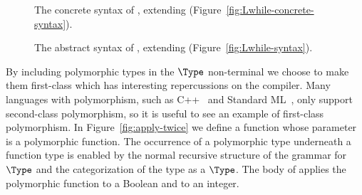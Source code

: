\documentclass[7x10,nocrop]{TimesAPriori_MIT}%
\newcommand{\gray}[1]{{\color{gray} #1}}
\begin{document}
\begin{figure}[tp]
\centering
\fbox{
  \begin{minipage}{0.96\textwidth}
\small
\[
\begin{array}{lcl}
  \Type &::=& \ldots \MID \LP\key{All}~\LP\Var\ldots\RP~ \Type\RP \MID \Var \\
  \Def &::=& \gray{ \CDEF{\Var}{\LS\Var \key{:} \Type\RS \ldots}{\Type}{\Exp} } \\
   &\MID& \LP\key{:}~\Var~\Type\RP \\
   &&       \LP\key{define}~ \LP\Var ~ \Var\ldots\RP ~ \Exp\RP  \\
  \LangPoly{} &::=& \gray{ \Def \ldots ~ \Exp }
\end{array}
\]
\end{minipage}
}
\caption{The concrete syntax of \LangPoly{}, extending \LangLoop{}
    (Figure~\ref{fig:Lwhile-concrete-syntax}).}
\label{fig:Rpoly-concrete-syntax}
\end{figure}

\begin{figure}[tp]
\centering
\fbox{
  \begin{minipage}{0.96\textwidth}
\small
\[
\begin{array}{lcl}
  \Type &::=& \ldots \MID \LP\key{All}~\LP\Var\ldots\RP~ \Type\RP \MID \Var \\
  \Def &::=& \gray{ \DEF{\Var}{\LP\LS\Var \key{:} \Type\RS \ldots\RP}{\Type}{\code{'()}}{\Exp} } \\
   &\MID& \DECL{\Var}{\Type} \\
   &&  \DEF{\Var}{\LP\Var \ldots\RP}{\key{'Any}}{\code{'()}}{\Exp}  \\
  \LangPoly{} &::=& \gray{ \PROGRAMDEFSEXP{\code{'()}}{\LP\Def\ldots\RP}{\Exp} }
\end{array}
\]
\end{minipage}
}
\caption{The abstract syntax of \LangPoly{}, extending \LangLoop{}
    (Figure~\ref{fig:Lwhile-syntax}).}
\label{fig:Rpoly-syntax}
\end{figure}

By including polymorphic types in the $\Type$ non-terminal we choose
to make them first-class which has interesting repercussions on the
compiler. Many languages with polymorphism, such as
C++~\citep{stroustrup88:_param_types} and Standard
ML~\citep{Milner:1990fk}, only support second-class polymorphism, so
it is useful to see an example of first-class polymorphism. In
Figure~\ref{fig:apply-twice} we define a function 
whose parameter is a polymorphic function. The occurrence of a
polymorphic type underneath a function type is enabled by the normal
recursive structure of the grammar for $\Type$ and the categorization
of the  type as a $\Type$.  The body of 
applies the polymorphic function to a Boolean and to an integer.
\end{document}
